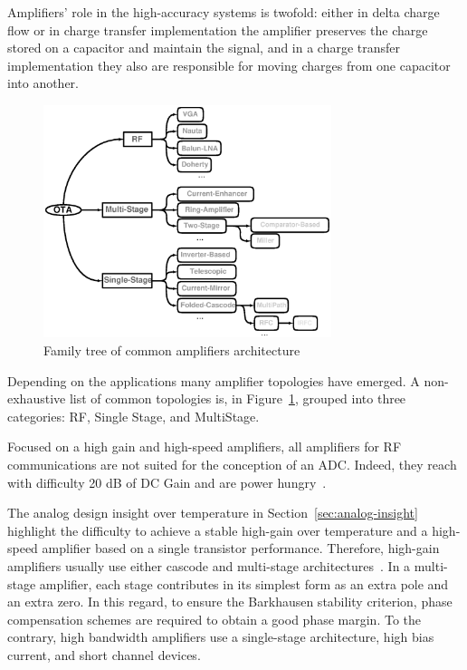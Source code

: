 Amplifiers' role in the high-accuracy systems is twofold: either in delta charge flow or in charge transfer implementation the amplifier preserves the charge stored on a capacitor and maintain the signal, and in a charge transfer implementation they also are responsible for moving charges from one capacitor into another.

\begin{figure}[htp]
    \centering
    \includegraphics[width=0.75\textwidth]{Chapter7/Figs/family_amplifier.ps}
    \caption{Family tree of common amplifiers architecture}
    \label{fig:ota_tree}
\end{figure}

Depending on the applications many amplifier topologies have emerged. A non-exhaustive list of common topologies is, in Figure~\ref{fig:ota_tree}, grouped into three categories: RF, Single Stage, and MultiStage.

Focused on a high gain and high-speed amplifiers, all amplifiers for RF communications are not suited for the conception of an ADC\@. Indeed, they reach with difficulty 20 dB of DC Gain and are power hungry~\cite{Nauta1992, Chen2014}.

The analog design insight over temperature in Section~\ref{sec:analog-insight} highlight the difficulty to achieve a stable high-gain over temperature and a high-speed amplifier based on a single transistor performance. Therefore, high-gain amplifiers usually use either cascode and multi-stage architectures~\cite{Bult1990}. In a multi-stage amplifier, each stage contributes in its simplest form as an extra pole and an extra zero. In this regard, to ensure the Barkhausen stability criterion, phase compensation schemes are required to obtain a good phase margin. 
To the contrary, high bandwidth amplifiers use a single-stage architecture, high bias current, and short channel devices.

